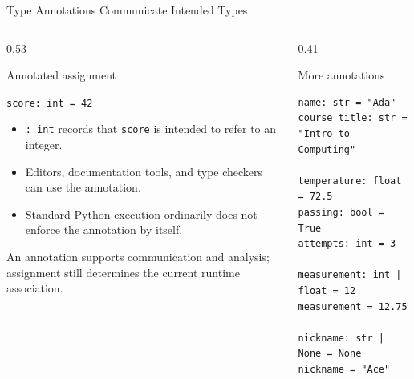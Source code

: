 \documentclass[aspectratio=169,10pt]{beamer}
\begin{document}
\begin{frame}[fragile,shrink=8]{Type Annotations Communicate Intended Types}

  \begin{columns}[T,onlytextwidth]

    \begin{column}{0.53\textwidth}

      \begin{block}{Annotated assignment}

        \texttt{score: int = 42}

      \end{block}

      \begin{itemize}

        \item \texttt{: int} records that \texttt{score} is intended to refer to an integer.

        \item Editors, documentation tools, and type checkers can use the annotation.

        \item Standard Python execution ordinarily does not enforce the annotation by itself.

      \end{itemize}

      \begin{exampleblockcp}

        An annotation supports communication and analysis; assignment still determines the current runtime association.

      \end{exampleblockcp}

    \end{column}

    \begin{column}{0.41\textwidth}

      \begin{block}{More annotations}
      \tiny
\begin{verbatim}
name: str = "Ada"
course_title: str = "Intro to Computing"

temperature: float = 72.5
passing: bool = True
attempts: int = 3

measurement: int | float = 12
measurement = 12.75

nickname: str | None = None
nickname = "Ace"
\end{verbatim}
      \end{block}

    \end{column}

  \end{columns}


\end{frame}
\end{document}

